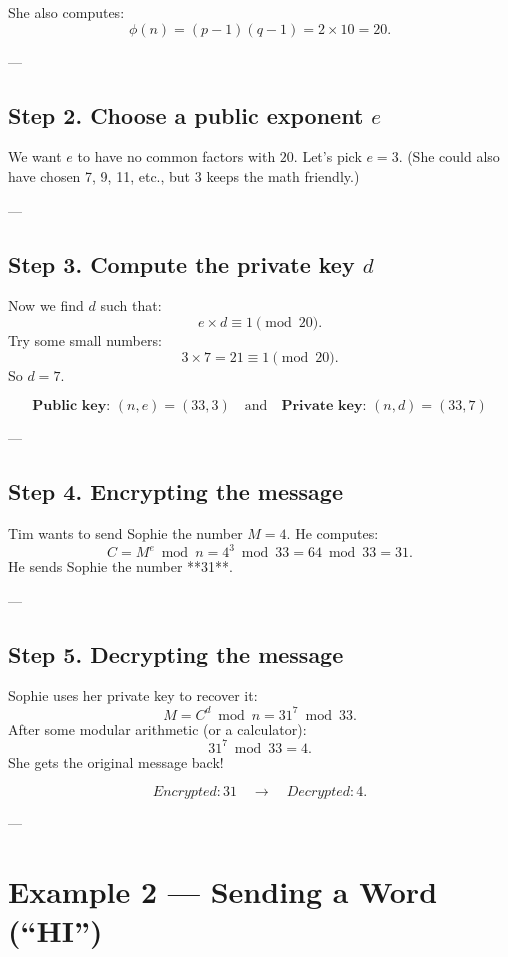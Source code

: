\documentclass[12pt]{article}
\begin{document}
She also computes:
\[
\phi(n) = (p - 1)(q - 1) = 2 \times 10 = 20.
\]

---

\subsection*{Step 2. Choose a public exponent \( e \)}

We want \( e \) to have no common factors with \( 20 \).  
Let’s pick \( e = 3 \).  
(She could also have chosen 7, 9, 11, etc., but 3 keeps the math friendly.)

---

\subsection*{Step 3. Compute the private key \( d \)}

Now we find \( d \) such that:
\[
e \times d \equiv 1 \pmod{20}.
\]
Try some small numbers:
\[
3 \times 7 = 21 \equiv 1 \pmod{20}.
\]
So \( d = 7. \)

\[
\textbf{Public key: } (n, e) = (33, 3)
\quad\text{and}\quad
\textbf{Private key: } (n, d) = (33, 7)
\]

---

\subsection*{Step 4. Encrypting the message}

Tim wants to send Sophie the number \( M = 4 \).  
He computes:
\[
C = M^e \bmod n = 4^3 \bmod 33 = 64 \bmod 33 = 31.
\]
He sends Sophie the number **31**.

---

\subsection*{Step 5. Decrypting the message}

Sophie uses her private key to recover it:
\[
M = C^d \bmod n = 31^7 \bmod 33.
\]
After some modular arithmetic (or a calculator):
\[
31^7 \bmod 33 = 4.
\]
She gets the original message back!

\[
\boxed{Encrypted: 31 \quad \longrightarrow \quad Decrypted: 4.}
\]

---

\section*{Example 2 — Sending a Word (“HI”)}
\end{document}
